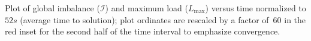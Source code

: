 Plot of global imbalance ($\mathcal{I}$) and maximum load ($L_{\max}$)
versus time normalized to $52s$ (average time to solution); plot
ordinates are rescaled by a factor of~$60$ in the red inset for the
second half of the time interval to emphasize convergence.
